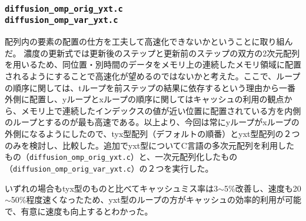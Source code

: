\documentclass{jarticle}
\begin{document}
\subsubsection{\texttt{diffusion\_omp\_orig\_yxt.c} \\ \texttt{diffusion\_omp\_var\_yxt.c}}
配列内の要素の配置の仕方を工夫して高速化できないかということに取り組んだ。
濃度の更新式では更新後のステップと更新前のステップの双方の2次元配列を用いるため、同位置・別時間のデータをメモリ上の連続したメモリ領域に配置されるようにすることで高速化が望めるのではないかと考えた。ここで、ループの順序に関しては、tループを前ステップの結果に依存するという理由から一番外側に配置し、yループとxループの順序に関してはキャッシュの利用の観点から、メモリ上で連続したインデックスの値が近い位置に配置されている方を内側のループとするのが最も高速である。以上より、今回は常にyループがxループの外側になるようにしたので、tyx型配列（デフォルトの順番）とyxt型配列の２つのみを検討し、比較した。追加でyxt型についてC言語の多次元配列を利用したもの（\texttt{diffusion\_omp\_orig\_yxt.c}）と、一次元配列化したもの（\texttt{diffusion\_omp\_orig\_var\_yxt.c}）の２つを実行した。\par
いずれの場合もtyx型のものと比べてキャッシュミス率は3$\sim$5\%改善し、速度も20$\sim$50\%程度速くなったため、yxt型のループの方がキャッシュの効率的利用が可能で、有意に速度も向上するとわかった。
\end{document}

